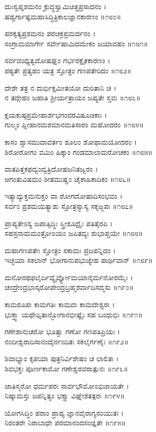 ದುಃಸ್ವಪ್ನಶಮನಂ ಕ್ರುದ್ಧಸ್ವಾಮಿಚಿತ್ತಪ್ರಸಾದನಂ ।\\
ಷಡ್ವರ್ಗಾಷ್ಟಮಹಾಸಿದ್ಧಿತ್ರಿಕಾಲಜ್ಞಾನಕಾರಣಂ ॥೧೮೦॥

ಪರಕೃತ್ಯಪ್ರಶಮನಂ ಪರಚಕ್ರಪ್ರಮರ್ದನಂ ।\\
ಸಂಗ್ರಾಮಮಾರ್ಗೇ ಸರ್ವೇಷಾಮಿದಮೇಕಂ ಜಯಾವಹಂ ॥೧೮೧॥

ಸರ್ವವಂಧ್ಯತ್ವದೋಷಘ್ನಂ ಗರ್ಭರಕ್ಷೈಕಕಾರಣಂ ।\\
ಪಠ್ಯತೇ ಪ್ರತ್ಯಹಂ ಯತ್ರ ಸ್ತೋತ್ರಂ ಗಣಪತೇರಿದಂ ॥೧೮೨॥

ದೇಶೇ ತತ್ರ ನ ದುರ್ಭಿಕ್ಷಮೀತಯೋ ದುರಿತಾನಿ ಚ ।\\
ನ ತದ್ಗೇಹಂ ಜಹಾತಿ ಶ್ರೀರ್ಯತ್ರಾಯಂ ಜಪ್ಯತೇ ಸ್ತವಃ ॥೧೮೩॥

ಕ್ಷಯಕುಷ್ಠಪ್ರಮೇಹಾರ್ಶಭಗಂದರವಿಷೂಚಿಕಾಃ ।\\
ಗುಲ್ಮಂ ಪ್ಲೀಹಾನಮಶಮಾನಮತಿಸಾರಂ ಮಹೋದರಂ ॥೧೮೪॥

ಕಾಸಂ ಶ್ವಾಸಮುದಾವರ್ತಂ ಶೂಲಂ ಶೋಫಾಮಯೋದರಂ ।\\
ಶಿರೋರೋಗಂ ವಮಿಂ ಹಿಕ್ಕಾಂ ಗಂಡಮಾಲಾಮರೋಚಕಂ ॥೧೮೫॥

ವಾತಪಿತ್ತಕಫದ್ವಂದ್ವತ್ರಿದೋಷಜನಿತಜ್ವರಂ ।\\
ಆಗಂತುವಿಷಮಂ ಶೀತಮುಷ್ಣಂ ಚೈಕಾಹಿಕಾದಿಕಂ ॥೧೮೬॥

ಇತ್ಯಾದ್ಯುಕ್ತಮನುಕ್ತಂ ವಾ ರೋಗದೋಷಾದಿಸಂಭವಂ ।\\
ಸರ್ವಂ ಪ್ರಶಮಯತ್ಯಾಶು ಸ್ತೋತ್ರಸ್ಯಾಸ್ಯ ಸಕೃಜ್ಜಪಃ ॥೧೮೭॥

ಪ್ರಾಪ್ಯತೇಽಸ್ಯ ಜಪಾತ್ಸಿದ್ಧಿಃ ಸ್ತ್ರೀಶೂದ್ರೈಃ ಪತಿತೈರಪಿ ।\\
ಸಹಸ್ರನಾಮಮಂತ್ರೋಽಯಂ ಜಪಿತವ್ಯಃ ಶುಭಾಪ್ತಯೇ ॥೧೮೮॥

ಮಹಾಗಣಪತೇಃ ಸ್ತೋತ್ರಂ ಸಕಾಮಃ ಪ್ರಜಪನ್ನಿದಂ ।\\
ಇಚ್ಛಯಾ ಸಕಲಾನ್ ಭೋಗಾನುಪಭುಜ್ಯೇಹ ಪಾರ್ಥಿವಾನ್ ॥೧೮೯॥

ಮನೋರಥಫಲೈರ್ದಿವ್ಯೈರ್ವ್ಯೋಮಯಾನೈರ್ಮನೋರಮೈಃ ।\\
ಚಂದ್ರೇಂದ್ರಭಾಸ್ಕರೋಪೇಂದ್ರಬ್ರಹ್ಮಶರ್ವಾದಿಸದ್ಮಸು ॥೧೯೦॥

ಕಾಮರೂಪಃ ಕಾಮಗತಿಃ ಕಾಮದಃ ಕಾಮದೇಶ್ವರಃ ।\\
ಭುಕ್ತ್ವಾ ಯಥೇಪ್ಸಿತಾನ್ಭೋಗಾನಭೀಷ್ಟೈಃ ಸಹ ಬಂಧುಭಿಃ ॥೧೯೧॥

ಗಣೇಶಾನುಚರೋ ಭೂತ್ವಾ ಗಣೋ ಗಣಪತಿಪ್ರಿಯಃ ।\\
ನಂದೀಶ್ವರಾದಿಸಾನಂದೈರ್ನಂದಿತಃ ಸಕಲೈರ್ಗಣೈಃ ॥೧೯೨॥

ಶಿವಾಭ್ಯಾಂ ಕೃಪಯಾ ಪುತ್ರನಿರ್ವಿಶೇಷಂ ಚ ಲಾಲಿತಃ ।\\
ಶಿವಭಕ್ತಃ ಪೂರ್ಣಕಾಮೋ ಗಣೇಶ್ವರವರಾತ್ಪುನಃ ॥೧೯೩॥

ಜಾತಿಸ್ಮರೋ ಧರ್ಮಪರಃ ಸಾರ್ವಭೌಮೋಽಭಿಜಾಯತೇ ।\\
ನಿಷ್ಕಾಮಸ್ತು ಜಪನ್ನಿತ್ಯಂ ಭಕ್ತ್ಯಾ ವಿಘ್ನೇಶತತ್ಪರಃ ॥೧೯೪॥

ಯೋಗಸಿದ್ಧಿಂ ಪರಾಂ ಪ್ರಾಪ್ಯ ಜ್ಞಾನವೈರಾಗ್ಯಸಂಯುತಃ ।\\
ನಿರಂತರೇ ನಿರಾಬಾಧೇ ಪರಮಾನಂದಸಂಜ್ಞಿತೇ ॥೧೯೫॥

